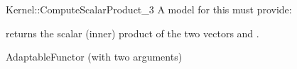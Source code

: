 \begin{ccRefFunctionObjectConcept}{Kernel::ComputeScalarProduct_3}
A model for this must provide:


{returns the scalar (inner) product of the two vectors  and .}

\ccRefines
AdaptableFunctor (with two arguments)

\ccSeeAlso
{}\\

\end{ccRefFunctionObjectConcept}
